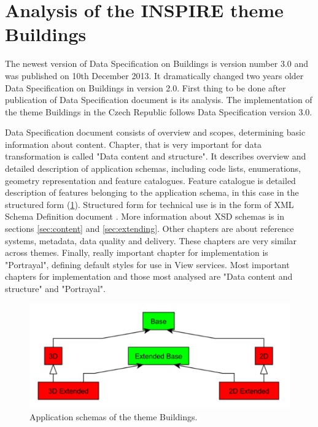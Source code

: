 \documentclass[eprint]{actapoly}
\begin{document}
\section{Analysis of the INSPIRE theme Buildings}
\label{sec:analysis}

The newest version of Data Specification on Buildings is version number 3.0 and was published on 10th December 2013. It dramatically changed two years older Data Specification on Buildings in version 2.0. First thing to be done after publication of Data Specification document is its analysis. The implementation of the theme Buildings in the Czech Republic follows Data Specification version 3.0.

Data Specification document consists of overview and scopes, determining basic information about content. Chapter, that is very important for data transformation is called "Data content and structure". It describes overview and detailed description of application schemas, including code lists, enumerations, geometry representation and feature catalogues. Feature catalogue is detailed description of features belonging to the application schema, in this case in the structured form (\ref{fig:feature_catalogue}). Structured form for technical use is in the form of XML Schema Definition document \cite{XSD - http://www.w3.org/TR/xmlschema11-1/}. More information about XSD schemas is in sections \ref{sec:content} and \ref{sec:extending}. Other chapters are about reference systems, metadata, data quality and delivery. These chapters are very similar across themes. Finally, really important  chapter for implementation is "Portrayal", defining default styles for use in View services. Most important chapters for implementation and those most analysed are "Data content and structure" and "Portrayal".

\begin{figure}
\centering
\includegraphics[width=0.8\linewidth]{pics/BU_schemas.pdf} %
\caption{Application schemas of the theme Buildings.}
\label{fig:feature_catalogue}
\end{figure}
\end{document}
